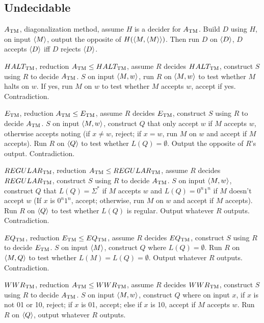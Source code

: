 \subsection{Undecidable}

\hyperref[lang:ATM_UDCDB]{$A_{\text{TM}}$}, diagonalization method, assume $H$ is a decider for $A_{\text{TM}}$. Build $D$ using $H$, on input $\langle{M}\rangle$, output the opposite of $H(\langle{M, \langle{M}\rangle}\rangle)$. Then run $D$ on $\langle{D}\rangle$, $D$ accepts $\langle{D}\rangle$ iff $D$ rejects $\langle{D}\rangle$. 

\hyperref[lang:HALTTM_UDCDB]{$HALT_{\text{TM}}$}, reduction $A_{\text{TM}} \leq HALT_{\text{TM}}$, assume $R$ decides $HALT_{\text{TM}}$, construct $S$ using $R$ to decide $A_{\text{TM}}$. $S$ on input $\langle{M, w}\rangle$, run $R$ on $\langle{M, w}\rangle$ to test whether $M$ halts on $w$. If yes, run $M$ on $w$ to test whether $M$ accepts $w$, accept if yes. Contradiction.

\hyperref[lang:ETM_UDCDB]{$E_{\text{TM}}$}, reduction $A_{\text{TM}} \leq E_{\text{TM}}$, assume $R$ decides $E_{\text{TM}}$, construct $S$ using $R$ to decide $A_{\text{TM}}$. $S$ on input $\langle{M,w}\rangle$, construct $Q$ that only accept $w$ if $M$ accepts $w$, otherwise accepts noting (if $x \neq w$, reject; if $x = w$, run $M$ on $w$ and accept if $M$ accepts). Run $R$ on $\langle{Q}\rangle$ to test whether $L(Q) = \emptyset$. Output the opposite of $R$'s output. Contradiction.

\hyperref[lang:REGULARTM_UDCDB]{$REGULAR_{\text{TM}}$}, reduction $A_{\text{TM}} \leq REGULAR_{\text{TM}}$, assume $R$ decides $REGULAR_{\text{TM}}$, construct $S$ using $R$ to decide $A_{\text{TM}}$. $S$ on input $\langle{M, w}\rangle$, construct $Q$ that $L(Q) = \Sigma^*$ if $M$ accepts $w$ and $L(Q) = 0^n1^n$ if $M$ doesn't accept $w$ (If $x$ is $0^n1^n$, accept; otherwise, run $M$ on $w$ and accept if $M$ accepts). Run $R$ on $\langle{Q}\rangle$ to test whether $L(Q)$ is regular. Output whatever $R$ outputs. Contradiction.

\hyperref[lang:EQTM_UDCDB]{$EQ_{\text{TM}}$}, reduction $E_{\text{TM}} \leq EQ_{\text{TM}}$, assume $R$ decides $EQ_{\text{TM}}$, construct $S$ using $R$ to decide $E_{\text{TM}}$. $S$ on input $\langle{M}\rangle$, construct $Q$ where $L(Q) = \emptyset$. Run $R$ on $\langle{M ,Q}\rangle$ to test whether $L(M) = L(Q) = \emptyset$. Output whatever $R$ outputs. Contradiction.

\hyperref[lang:WWRTM_UDCDB]{$WWR_{\text{TM}}$}, reduction $A_{\text{TM}} \leq WWR_{\text{TM}}$, assume $R$ decides $WWR_{\text{TM}}$, construct $S$ using $R$ to decide $A_{\text{TM}}$. $S$ on input $\langle{M, w}\rangle$, construct $Q$ where on input $x$, if $x$ is not 01 or 10, reject; if $x$ is 01, accept; else if $x$ is 10, accept if $M$ accepts $w$. Run $R$ on $\langle{Q}\rangle$, output whatever $R$ outputs.

